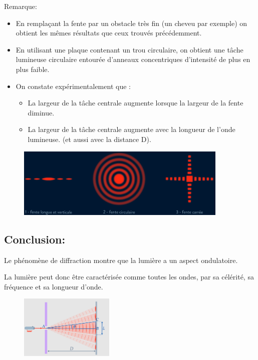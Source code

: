 \documentclass[12pt]{article}
\begin{document}
\begin{tcolorbox}
Remarque: 	
\begin{itemize}
	\item En remplaçant la fente par un obstacle très fin (un cheveu par exemple) on obtient les mêmes résultats que ceux trouvés
précédemment.

\item En utilisant une plaque contenant un trou circulaire, on obtient une tâche lumineuse circulaire entourée d'anneaux concentriques
d'intensité de plus en plus faible.

\item On constate expérimentalement que :
	\begin{itemize}
		\item La largeur de la tâche centrale augmente lorsque la largeur de la fente diminue.

		\item  La largeur de la tâche centrale augmente avec la longueur de l'onde lumineuse. (et aussi avec la distance D).
		\end{itemize}
	\end{itemize}
\end{tcolorbox}
\begin{figure}[h]
	\begin{center}
		\includegraphics[width=0.9\textwidth]{./img/OLtypeDiff.png}
	\end{center}
	\vspace{-1.2cm}
\end{figure}
\subsection{Conclusion:}
\begin{tcolorbox}

Le phénomène de diffraction montre que la lumière a un aspect ondulatoire.

La lumière peut donc être caractérisée comme toutes les ondes, par sa célérité, sa fréquence et sa longueur d'onde.
\end{tcolorbox}
\begin{figure}
	\vspace{-1.5cm}
	\includegraphics[width=0.4\textwidth]{./img/OLQngulaire.png}
\end{figure}
\end{document}
